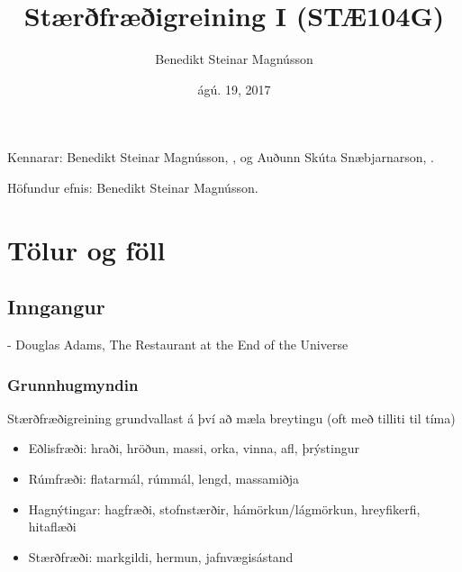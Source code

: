 \documentclass[b5paper,10pt,icelandic]{sphinxmanual}
\title{Stærðfræðigreining I (STÆ104G)}
\date{ágú. 19, 2017}
\author{Benedikt Steinar Magnússon}
\begin{document}
\maketitle
\sphinxtableofcontents
{}\label{\detokenize{index::doc}}


Kennarar: Benedikt Steinar Magnússon, , og
Auðunn Skúta Snæbjarnarson, .

Höfundur efnis: Benedikt Steinar Magnússon.


\chapter{Tölur og föll}
\label{\detokenize{kafli01::doc}}\label{\detokenize{kafli01:tolur-og-foll}}\label{\detokenize{kafli01:staerfraeigreining-i-stae104g-haskoli-islands-haust-2017}}

\section{Inngangur}
\label{\detokenize{kafli01:inngangur}}

- Douglas Adams, The Restaurant at the End of the Universe


\subsection{Grunnhugmyndin}
\label{\detokenize{kafli01:grunnhugmyndin}}
Stærðfræðigreining grundvallast á því að mæla breytingu (oft með tilliti
til tíma)
\begin{itemize}
\item {} 
Eðlisfræði: hraði, hröðun, massi, orka, vinna, afl, þrýstingur

\item {} 
Rúmfræði: flatarmál, rúmmál, lengd, massamiðja

\item {} 
Hagnýtingar: hagfræði, stofnstærðir, hámörkun/lágmörkun, hreyfikerfi, hitaflæði

\item {} 
Stærðfræði: markgildi, hermun, jafnvægisástand

\end{itemize}
\end{document}
